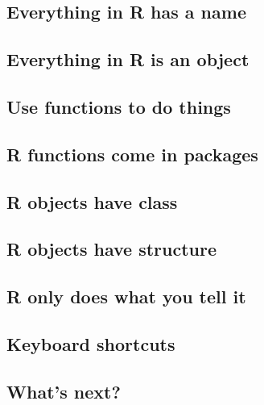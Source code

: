 \documentclass[
]{book}
\begin{document}
\hypertarget{everything-in-r-has-a-name}{%
\subsection{Everything in R has a name}\label{everything-in-r-has-a-name}}

\hypertarget{everything-in-r-is-an-object}{%
\subsection{Everything in R is an object}\label{everything-in-r-is-an-object}}

\hypertarget{use-functions-to-do-things}{%
\subsection{Use functions to do things}\label{use-functions-to-do-things}}

\hypertarget{r-functions-come-in-packages}{%
\subsection{R functions come in packages}\label{r-functions-come-in-packages}}

\hypertarget{r-objects-have-class}{%
\subsection{R objects have class}\label{r-objects-have-class}}

\hypertarget{r-objects-have-structure}{%
\subsection{R objects have structure}\label{r-objects-have-structure}}

\hypertarget{r-only-does-what-you-tell-it}{%
\subsection{R only does what you tell it}\label{r-only-does-what-you-tell-it}}

\hypertarget{keyboard-shortcuts}{%
\subsection{Keyboard shortcuts}\label{keyboard-shortcuts}}

\hypertarget{whats-next}{%
\subsection{What's next?}\label{whats-next}}
\end{document}
